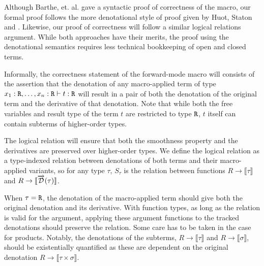   Although Barthe, et. al.\cite{barthe2020versatility} gave a syntactic proof of correctness of the macro, our formal proof follows the more denotational style of proof given by Huot, Staton and \Vakar{}\cite{huot2020correctness}.
  Likewise, our proof of correctness will follow a similar logical relations argument.
  While both approaches have their merits, the proof using the denotational semantics requires less technical bookkeeping of open and closed terms.

  Informally, the correctness statement of the forward-mode macro will consists of the assertion that the denotation of any macro-applied term of type $x_1 : \texttt{R}, \dots, x_n : \texttt{R} \vdash t : \texttt{R}$ will result in a pair of both the denotation of the original term and the derivative of that denotation.
  Note that while both the free variables and result type of the term $t$ are restricted to type $\texttt{R}$, $t$ itself can contain subterms of higher-order types.

  The logical relation will ensure that both the smoothness property and the derivatives are preserved over higher-order types.
  We define the logical relation as a type-indexed relation between denotations of both terms and their macro-applied variants, so for any type $\tau$, $S_\tau$ is the relation between functions $R \rightarrow \llbracket \tau \rrbracket$ and $R \rightarrow \llbracket \overrightarrow{\mathcal{D}}(\tau) \rrbracket$.

  When $\tau = \texttt{R}$, the denotation of the macro-applied term should give both the original denotation and its derivative.
  With function types, as long as the relation is valid for the argument, applying these argument functions to the tracked denotations should preserve the relation.
  Some care has to be taken in the case for products.
  Notably, the denotations of the subterms, $R \rightarrow \llbracket \tau \rrbracket$ and $R \rightarrow \llbracket \sigma \rrbracket$, should be existentially quantified as these are dependent on the original denotation $R \rightarrow \llbracket \tau \times \sigma \rrbracket$.

